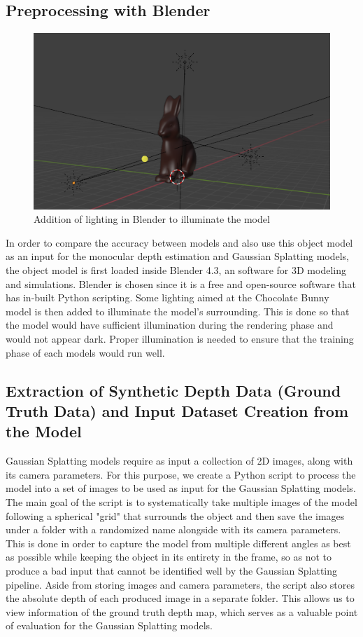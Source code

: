 \subsection{Preprocessing with Blender}

\begin{figure}[h]
    \centering
    \includegraphics[width=0.5\linewidth]{figures/blender-showcase-01.png}
    \caption{Addition of lighting in Blender to illuminate the model}
    \label{fig:chocolate-bunny-blender}
\end{figure}

In order to compare the accuracy between models and also use this object model as an input for the monocular depth estimation and Gaussian Splatting models, the object model is first loaded inside Blender 4.3, an software for 3D modeling and simulations. Blender is chosen since it is a free and open-source software that has in-built Python scripting. Some lighting aimed at the Chocolate Bunny model is then added to illuminate the model's surrounding. This is done so that the model would have sufficient illumination during the rendering phase and would not appear dark. Proper illumination is needed to ensure that the training phase of each models would run well. 

\subsection{Extraction of Synthetic Depth Data (Ground Truth Data) and Input Dataset Creation from the Model}

Gaussian Splatting models require as input a collection of 2D images, along with its camera parameters. For this purpose, we create a Python script to process the model into a set of images to be used as input for the Gaussian Splatting models. The main goal of the script is to systematically take multiple images of the model following a spherical "grid" that surrounds the object and then save the images under a folder with a randomized name alongside with its camera parameters. This is done in order to capture the model from multiple different angles as best as possible while keeping the object in its entirety in the frame, so as not to produce a bad input that cannot be identified well by the Gaussian Splatting pipeline. Aside from storing images and camera parameters, the script also stores the absolute depth of each produced image in a separate folder. This allows us to view information of the ground truth depth map, which serves as a valuable point of evaluation for the Gaussian Splatting models. 

